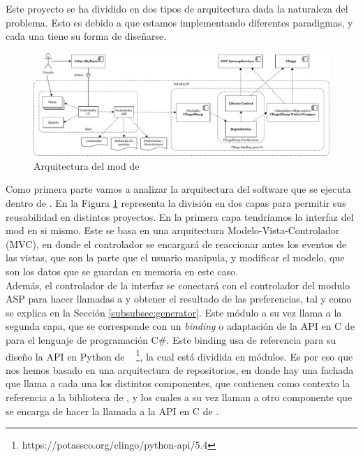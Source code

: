 Este proyecto se ha dividido en dos tipos de arquitectura dada la naturaleza del problema. Esto es debido a que estamos implementando diferentes paradigmas, y cada una tiene su forma de diseñarse. \\

\begin{figure}[!h]
	\centering
	\includegraphics[width=\textwidth]{images/arquitectura-mod}
	\caption{Arquitectura del mod de \cities}
	\label{fig:arquitectura-mod}
\end{figure}

Como primera parte vamos a analizar la arquitectura del software que se ejecuta dentro de \cities. En la Figura \ref{fig:arquitectura-mod} representa la división en dos capas para permitir sus reusabilidad en distintos proyectos. En la primera capa tendríamos la interfaz del mod en si mismo. Este se basa en una arquitectura Modelo-Vista-Controlador (MVC), en donde el controlador se encargará de reaccionar antes los eventos de las vistas, que son la parte que el usuario manipula, y modificar el modelo, que son los datos que se guardan en memoria en este caso. \\

Además, el controlador de la interfaz se conectará con el controlador del modulo ASP para hacer llamadas a \clingo y obtener el resultado de las preferencias, tal y como se explica en la Sección \ref{subsubsec:generator}. Este módulo a su vez llama a la segunda capa, que se corresponde con un \textit{binding} o adaptación de la API en C de \clingo para el lenguaje de programación C\#. Este binding usa de referencia para su diseño la API en Python de \clingo~ \footnote{https://potassco.org/clingo/python-api/5.4}, la cual está dividida en módulos. Es por eso que nos hemos basado en una arquitectura de repositorios, en donde hay una fachada que llama a cada una los distintos componentes, que contienen como contexto la referencia a la biblioteca de \clingo, y los cuales a su vez llaman a otro componente que se encarga de hacer la llamada a la API en C de \clingo. \\

